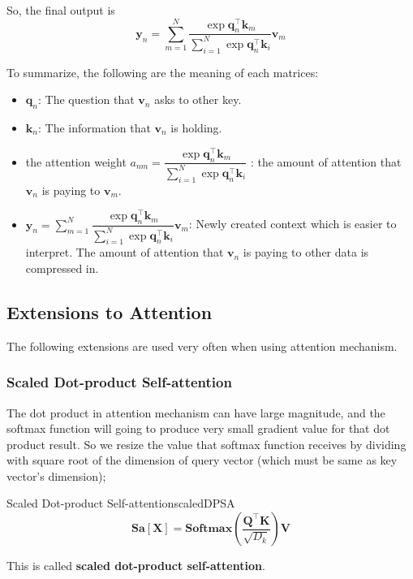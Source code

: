 \documentclass{article}
\begin{document}
            So, the final output is
            \[
                \textbf{y}_n = \sum_{m=1}^{N} \frac{\exp \textbf{q}_n^\top \textbf{k}_m}
                {\sum_{i=1}^{N} \exp{\textbf{q}_n^\top \textbf{k}_i}} \textbf{v}_m
            \]

            To summarize, the following are the meaning of each matrices:
            \begin{itemize}
                \item $\textbf{q}_n$: The question that $\textbf{v}_n$ asks to other key.
                \item $\textbf{k}_n$: The information that $\textbf{v}_n$ is holding.
                \item the attention weight $a_{nm} = \dfrac{\exp \textbf{q}_n^\top \textbf{k}_m}{\sum_{i=1}^{N} \exp{\textbf{q}_n^\top \textbf{k}_i}}$
                : the amount of attention that $\textbf{v}_n$ is paying to $\textbf{v}_m$.
                \item $\textbf{y}_n = \sum_{m=1}^{N} \dfrac{\exp \textbf{q}_n^\top \textbf{k}_m}
                {\sum_{i=1}^{N} \exp{\textbf{q}_n^\top \textbf{k}_i}} \textbf{v}_m$: Newly created context which is easier to interpret.
                The amount of attention that $\textbf{v}_n$ is paying to other data is compressed in.
            \end{itemize}

    \subsection{Extensions to Attention}
        The following extensions are used very often when using attention mechanism.
        \subsubsection{Scaled Dot-product Self-attention}
            The dot product in attention mechanism can have large magnitude, and the softmax function will going to produce
            very small gradient value for that dot product result. So we resize the value that softmax function receives by
            dividing with square root of the dimension of query vector (which must be same as key vector's dimension);
            \begin{defn}{Scaled Dot-product Self-attention}{scaledDPSA}
            \[
                \textbf{Sa}[\textbf{X}]=\textbf{Softmax}\left(\frac{\textbf{Q}^{\top}\textbf{K}}{\sqrt{D_k}}\right)\textbf{V}
            \]
            \end{defn}
            This is called \textbf{scaled dot-product self-attention}.
        
\end{document}
